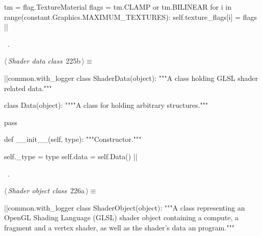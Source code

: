 \documentclass[%
    a4paper,    %
    justified,  %
    nobib,      %
    openany     %
]{tufte-book}
\makeatletter
\renewcommand{\label}[1]{\@tufte@label{##1}}%
\makeatother
\begin{document}
\begin{fullwidth}
\begin{flushleft}
\begin{minipage}{\linewidth}
\begin{pythoncode}
        tm = flag.TextureMaterial
        flags = tm.CLAMP or tm.BILINEAR
        for i in range(constant.Graphics.MAXIMUM_TEXTURES):
            self.texture_flags[i] = flags
|\NWsep|
\end{pythoncode}
\vspace{1.5ex}
\footnotesize
\begin{list}{}{\setlength{\itemsep}{-\parsep}\setlength{\itemindent}{-\leftmargin}}
\item \NWtxtMacroRefIn\ .

\item{}
\end{list}
\end{minipage}\vspace{4ex}
\end{flushleft}
\begin{flushleft} \small
\begin{minipage}{\linewidth}\label{scrap232}\raggedright\small
{} $\langle\,${\itshape Shader data class}\nobreak\ {\footnotesize {225b}}$\,\rangle\equiv$
\vspace{-1ex}
\begin{pythoncode}
|\normalfont{}\fontfamily{}|common.with_logger
class ShaderData(object):
    """A class holding GLSL shader related data."""


    class Data(object):
        """"A class for holding arbitrary structures."""

        pass

    def __init__(self, type):
        """Constructor."""

        self._type = type
        self.data  = self.Data()
|\NWsep|
\end{pythoncode}
\vspace{1.5ex}
\footnotesize
\begin{list}{}{\setlength{\itemsep}{-\parsep}\setlength{\itemindent}{-\leftmargin}}
\item \NWtxtMacroRefIn\ .

\item{}
\end{list}
\end{minipage}\vspace{4ex}
\end{flushleft}
\begin{flushleft} \small
\begin{minipage}{\linewidth}\label{scrap233}\raggedright\small
{} $\langle\,${\itshape Shader object class}\nobreak\ {\footnotesize {226a}}$\,\rangle\equiv$
\vspace{-1ex}
\begin{pythoncode}
|\normalfont{}\fontfamily{}|common.with_logger
class ShaderObject(object):
    """A class representing an OpenGL Shading Language (GLSL) shader object
    containing a compute, a fragment and a vertex shader, as well as the
    shader's data an program."""


\end{pythoncode}
\end{minipage}
\end{flushleft}
\end{fullwidth}
\end{document}
